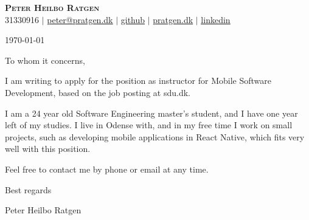 \documentclass{article}
\begin{document}
\begin{center}
  \textbf{\huge{\scshape{Peter Heilbo Ratgen}}}\\ 
  \vspace{0.2cm}
  \small 31330916 $|$
  \href{mailto:peter@pratgen.dk}{\underline{peter@pratgen.dk}} $|$
  \href{https://github.com/PeterRatgen }{\underline{github}} $|$
  \href{https://pratgen.dk}{\underline{pratgen.dk}} $|$
  \href{https://www.linkedin.com/in/peter-ratgen-a1236529/}{\underline{linkedin}}
\end{center}
\vspace{0.5cm}

\begin{flushright}
  \today
\end{flushright}
\vspace{0.5cm}
To whom it concerns,

I am writing to apply for the position as instructor for Mobile Software
Development, based on the job posting at sdu.dk.  \vspace{\baselineskip}

I am a 24 year old Software Engineering master's student, and I have one year
left of my studies. I live in Odense with, and in my free time I work on small
projects, such as developing mobile applications in React Native, which fits
very well with this position. 
\vspace{\baselineskip}

Feel free to contact me by phone or email at any time. \vspace{\baselineskip}

\begin{flushleft}
Best regards 

\vspace{\baselineskip} Peter Heilbo Ratgen
\end{flushleft}
\end{document}
